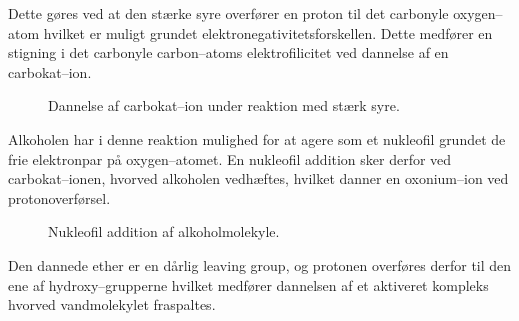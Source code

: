     Dette gøres ved at den stærke syre overfører en proton til det carbonyle oxygen--atom hvilket er muligt grundet elektronegativitetsforskellen. Dette medfører en stigning i det carbonyle carbon--atoms elektrofilicitet ved dannelse af en carbokat--ion. \vskip 8pt
    \begin{figure}[H]
        \caption{Dannelse af carbokat--ion under reaktion med stærk syre.}
    \end{figure}
    Alkoholen har i denne reaktion mulighed for at agere som et nukleofil grundet de frie elektronpar på oxygen--atomet. En nukleofil addition sker derfor ved carbokat--ionen, hvorved alkoholen vedhæftes, hvilket danner en oxonium--ion ved protonoverførsel.
    \begin{figure}[H]
        \caption{Nukleofil addition af alkoholmolekyle.}
    \end{figure}
    Den dannede ether er en dårlig leaving group, og protonen overføres derfor til den ene af hydroxy--grupperne hvilket medfører dannelsen af et aktiveret kompleks hvorved vandmolekylet fraspaltes. 
